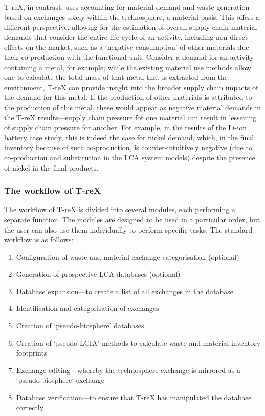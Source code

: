 \documentclass[a4paper,fleqn]{cas-dc}
\begin{document}
	T-reX, in contrast, uses accounting for material demand and waste generation
	based on exchanges solely within the technosphere, a material basis. This
	offers a different perspective, allowing for the estimation of overall supply
	chain material demands that consider the entire life cycle of an activity,
	including non-direct effects on the market, such as a `negative consumption' of
	other materials due their co-production with the functional unit. Consider a
	demand for an activity containing a metal, for example; while the existing
	material use methods allow one to calculate the total mass of that metal that
	is extracted from the environment, T-reX can provide insight into the broader
	supply chain impacts of the demand for this metal. If the production of other
	materials is attributed to the production of this metal, these would appear as
	negative material demands in the T-reX results---supply chain pressure for one
	material can result in lessening of supply chain pressure for another. For
	example, in the results of the Li-ion battery case study, this is indeed the
	case for nickel demand, which, in the final inventory because of such
	co-production, is counter-intuitively negative (due to co-production and
	substitution in the LCA system models) despite the presence of nickel in the
	final products.
	
	\subsubsection{The workflow of T-reX}
	
	The workflow of T-reX is divided into several modules, each performing a
	separate function. The modules are designed to be used in a particular order,
	but the user can also use them individually to perform specific tasks. The
	standard workflow is as follows:
	
	\begin{enumerate}
		\item Configuration of waste and material exchange categorisation (optional)
		\item Generation of prospective LCA databases (optional)
		\item Database expansion---to create a list of all exchanges in the database
		\item Identification and categorisation of exchanges
		\item Creation of `pseudo-biosphere' databases
		\item Creation of `pseudo-LCIA' methods to calculate waste and material inventory
		footprints
		\item Exchange editing---whereby the technosphere exchange is mirrored as a
		`pseudo-biosphere' exchange
		\item Database verification---to ensure that T-reX has manipulated the database
		correctly
	\end{enumerate}
	
\end{document}
